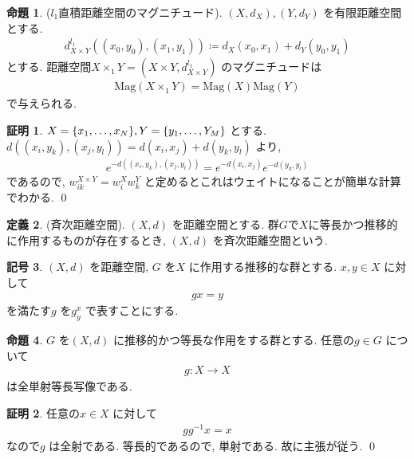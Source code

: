 \documentclass[10pt, fleqn, label-section=none]{bxjsarticle}
\theoremstyle{definition}
\newtheorem{dfn}{定義}[section]
\newtheorem{prop}[dfn]{命題}
\newtheorem{notation}[dfn]{記号}
\newtheorem*{pf*}{証明}
\newcommand{\cbra}[1]{\mleft\{#1\mright\}}
\renewcommand{\;}{\, ; \,}
\newcommand{\Mag}{\textrm{Mag}}
\begin{document}
\begin{prop}($l_1$直積距離空間のマグニチュード). $(X, d_X), (Y, d_Y)$ を有限距離空間とする. 
\begin{align*} d_{X\times Y}^{l_1} ((x_0, y_0), (x_1, y_1)) \coloneqq d_X (x_0, x_1) + d_Y (y_0, y_1)\end{align*}
とする. 距離空間$X \times_1 Y = (X \times Y, d_{X\times Y}^{l_1} ) $ のマグニチュードは
\begin{align*} \Mag(X \times _1 Y ) = \Mag(X) \Mag(Y) \end{align*}
で与えられる.
\end{prop}
\begin{pf*}$X = \cbra{x_1, \ldots, x_N}, Y = \cbra{y_1, \ldots , Y_M}$ とする. 
$d((x_i, y_k), (x_j, y_l)) = d(x_i, x_j) + d(y_k, y_l ) $ より, 
\begin{align*} e^{- d((x_i, y_k), (x_j, y_l)) } = e^{-d(x_i, x_j) } e^{-d(y_k, y_l ) }\end{align*}
であるので, $w^{X\times Y}_{ik} = w^X_i w^Y_k$ と定めるとこれはウェイトになることが簡単な計算でわかる. 
\qed
\end{pf*}




\begin{dfn}(斉次距離空間). 
$(X, d)$ を距離空間とする. 群$G$で$X$に等長かつ推移的に作用するものが存在するとき, $(X, d)$ を斉次距離空間という. 

\end{dfn}




\begin{notation}$(X, d)$ を距離空間, $G$ を$X$ に作用する推移的な群とする. $x, y \in X$ に対して 
\begin{align*} g x = y \end{align*}
を満たす$g$ を$g^{x}_y$ で表すことにする.
\end{notation}




\begin{prop}$G$ を$(X, d)$ に推移的かつ等長な作用をする群とする. 任意の$g \in G$ について
\begin{align*} g: X \rightarrow X\end{align*}
は全単射等長写像である.
\end{prop}
\begin{pf*}任意の$x \in X$ に対して
\begin{align*} g g^{-1}x = x\end{align*}
なので$g$ は全射である. 等長的であるので, 単射である. 故に主張が従う.
\qed
\end{pf*}
\end{document}
